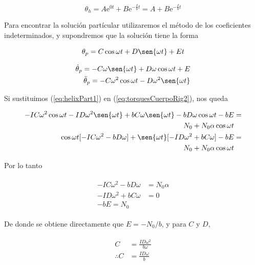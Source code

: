 \documentclass[a4paper,10pt]{article}
\numberwithin{equation}{section}
\newcommand{\euler}{\mathrm{e}}
\begin{document}
\begin{equation}
 \theta_h = A \euler^{0t} + B \euler^{-\frac{I}{b}t} = A + B \euler^{-\frac{I}{b}t}
 \label{eq:solucHelixHomog}
\end{equation}

Para encontrar la solución partícular utilizaremos el método de los coeficientes
indeterminados, y supondremos que la solución tiene la forma

$$
\theta_p = C \cos{\omega t} + D \sen{\omega t} + E t
$$

\begin{align}
 \begin{split}
  \dot{\theta}_p = - C \omega \sen{\omega t} + D \omega \cos{\omega t} + E \\
  \ddot{\theta}_p = - C \omega^2 \cos{\omega t} - D \omega^2 \sen{\omega t}
  \label{eq:helixPart1}
 \end{split}
\end{align}

Si sustituimos (\ref{eq:helixPart1}) en (\ref{eq:torquesCuerpoRig2}), nos queda

\begin{align*}
 \begin{split}
 -IC\omega^2 \cos{\omega t} - ID\omega^2 \sen{\omega t} + bC\omega \sen{\omega t} 
 -bD\omega \cos{\omega t} - bE &= \\ N_0 + N_0\alpha \cos{\omega t} \\
 \cos{\omega t}[-IC\omega^2 - bD\omega] + \sen{\omega t}[-ID\omega^2+bC\omega]
 -bE  &= \\ N_0 + N_0\alpha \cos{\omega t}
 \end{split}
\end{align*}

Por lo tanto

\begin{align*}
 \begin{split}
  -IC\omega^2 - bD\omega &= N_0 \alpha \\
  -ID\omega^2+bC\omega &= 0 \\
  - bE = N_0
 \end{split}
\end{align*}

De donde se obtiene directamente que $E = -N_0/b$, y para $C$ y $D$, 

\begin{align*}
 \begin{split}
  C &= \frac{ID\omega^2}{b\omega} \\
  \therefore C &= \frac{ID\omega}{b} 
 \end{split}
\end{align*}
\end{document}

